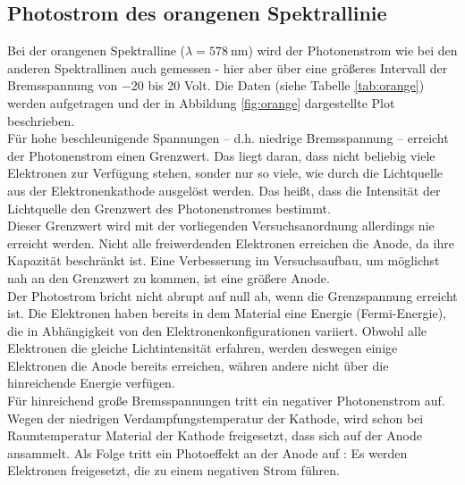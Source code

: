 	
\clearpage
\subsection{Photostrom des orangenen Spektrallinie}
Bei der orangenen Spektralline ($\lambda = \SI{578}{\nano\meter}$) wird der Photonenstrom wie bei den anderen Spektrallinen auch gemessen - hier aber über eine größeres Intervall der Bremsspannung von  \num{-20} bis \num{20} Volt. Die Daten (siehe Tabelle \ref{tab:orange}) werden aufgetragen und der in Abbildung \ref{fig:orange} dargestellte Plot beschrieben. \\
Für hohe beschleunigende Spannungen -- d.h. niedrige Bremsspannung -- erreicht der Photonenstrom einen Grenzwert. Das liegt daran, dass nicht beliebig viele Elektronen zur Verfügung stehen, sonder nur so viele, wie durch die Lichtquelle aus der Elektronenkathode ausgelöst werden. Das heißt, dass die Intensität der Lichtquelle den Grenzwert des Photonenstromes bestimmt. \\
Dieser Grenzwert wird mit der vorliegenden Versuchsanordnung allerdings nie erreicht werden. Nicht alle freiwerdenden Elektronen erreichen die Anode, da ihre Kapazität beschränkt ist. Eine Verbesserung  im Versuchsaufbau, um möglichst nah an den Grenzwert zu kommen, ist eine größere Anode. \\

Der Photostrom bricht nicht abrupt auf null ab, wenn die Grenzspannung erreicht ist. Die Elektronen haben bereits in dem Material eine Energie (Fermi-Energie), die in Abhängigkeit von den Elektronenkonfigurationen variiert. Obwohl alle Elektronen die gleiche Lichtintensität erfahren, werden deswegen einige Elektronen die Anode bereits erreichen, währen andere nicht über die hinreichende Energie verfügen. \\
Für hinreichend große Bremsspannungen tritt ein negativer Photonenstrom auf. Wegen der niedrigen Verdampfungstemperatur der Kathode, wird schon bei Raumtemperatur Material der Kathode freigesetzt, dass sich auf der Anode ansammelt. Als Folge tritt ein Photoeffekt an der Anode auf : Es werden Elektronen freigesetzt, die zu einem negativen Strom führen.

